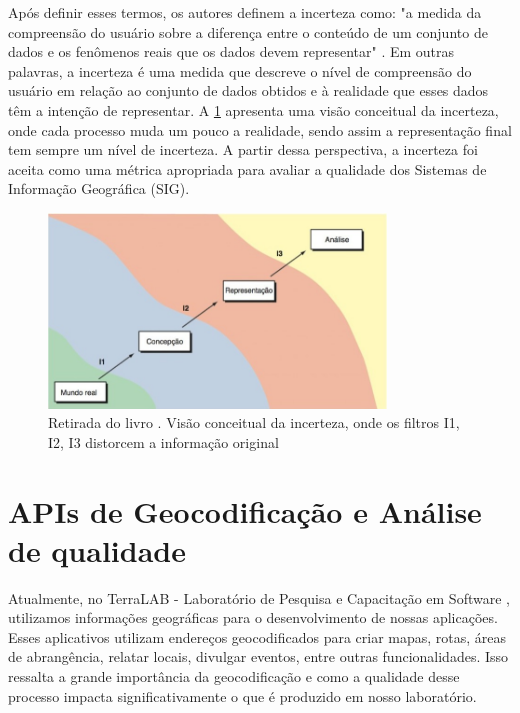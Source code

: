 Após definir esses termos, os autores definem a incerteza como: "a medida da compreensão do usuário sobre a diferença entre o conteúdo de um conjunto de dados e os fenômenos reais que os dados devem representar" \cite{longley2013}. Em outras palavras, a incerteza é uma medida que descreve o nível de compreensão do usuário em relação ao conjunto de dados obtidos e à realidade que esses dados têm a intenção de representar. A \ref{fig:incerteza} apresenta uma visão conceitual da incerteza, onde cada processo muda um pouco a realidade, sendo assim a representação final tem sempre um nível de incerteza. A partir dessa perspectiva, a incerteza foi aceita como uma métrica apropriada para avaliar a qualidade dos Sistemas de Informação Geográfica (SIG).

\begin{figure}[ht]
   \centering
   \includegraphics[width=0.8\textwidth]{Figuras/incertezaLivro.jpeg}
   \caption{Retirada do livro \cite{longley2013}. Visão conceitual da incerteza, onde os filtros I1, I2, I3 distorcem a informação original}
   \label{fig:incerteza}
\end{figure}

\section{APIs de Geocodificação e Análise de qualidade}
Atualmente, no TerraLAB - Laboratório de Pesquisa e Capacitação em Software \cite{terralab}, utilizamos informações geográficas para o desenvolvimento de nossas aplicações. Esses aplicativos utilizam endereços geocodificados para criar mapas, rotas, áreas de abrangência, relatar locais, divulgar eventos, entre outras funcionalidades. Isso ressalta a grande importância da geocodificação e como a qualidade desse processo impacta significativamente o que é produzido em nosso laboratório.


